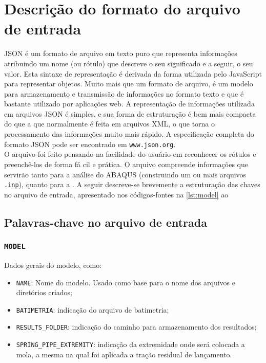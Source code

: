 \apendices
\renewcommand{\apendicesname}{AP\^ENDICES}
\partpage

\chapter{Descrição do formato do arquivo de entrada\label{apendice:json}}

JSON é um formato de arquivo em texto puro que representa informações atribuindo um nome (ou rótulo) que descreve o seu significado e a seguir, o seu valor. Esta sintaxe de representação é derivada da forma utilizada pelo JavaScript para representar objetos. Muito mais que um formato de arquivo, é um modelo para armazenamento e transmissão de informações no formato texto e que é bastante utilizado por aplicações web. A representação de informações utilizada em arquivos JSON é simples, e sua forma de estruturação é bem mais compacta do que a que normalmente é feita em arquivos XML, o que torna o processamento das informações muito mais rápido. A especificação completa do formato JSON pode ser encontrado em \texttt{www.json.org}.
\\

O arquivo foi feito pensando na facilidade do usuário em reconhecer os rótulos e preenchê-los de forma fá\newline
cil e prática.
O arquivo compreende informações que servirão tanto para a análise do ABAQUS (construindo um ou mais arquivos \texttt{.inp}), quanto para a \fatfree.
A seguir descreve-se brevemente a estruturação das chaves no arquivo de entrada, apresentado nos códigos-fontes na \autoref{lst:model} ao

\section*{Palavras-chave no arquivo de entrada}

\subsection{\texttt{MODEL}}

Dados gerais do modelo, como:

\begin{itemize}
  \item \texttt{NAME}: Nome do modelo. Usado como base para o nome dos arquivos e diretórios criados;
  \item \texttt{BATIMETRIA}: indicação do arquivo de batimetria;
  \item \texttt{RESULTS\_FOLDER}: indicação do caminho para armazenamento dos resultados;
  \item \texttt{SPRING\_PIPE\_EXTREMITY}: indicação da extremidade onde será colocada a mola, a mesma na qual foi aplicada a tração residual de lançamento.
\end{itemize}

